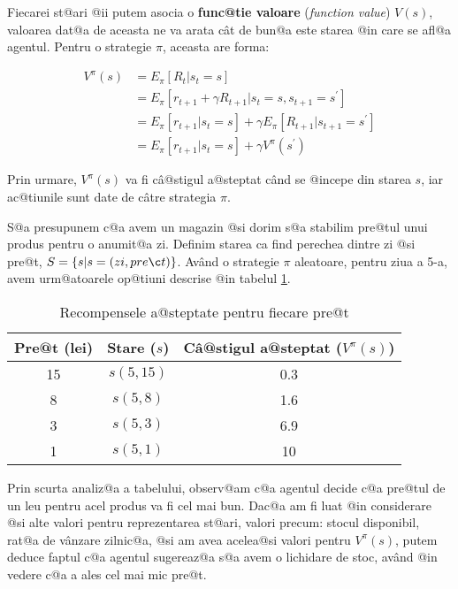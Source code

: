Fiecarei st@ari @ii putem asocia o \textbf{func@tie valoare} (\textsl{function value}) $V(s)$, valoarea dat@a de aceasta ne va arata c\^ at de bun@a este starea @in care se afl@a agentul. Pentru o strategie $\pi$, aceasta are forma:


\begin{align}
	V^{\pi}(s) & =   E_{\pi} \left[ R_t | s_t = s \right] \\
	& =  E_{\pi} \left[ r_{t+1} + \gamma R_{t+1} | s_t = s, s_{t+1} = s^{\prime} \right] \\
	& =   E_{\pi} \left[ r_{t+1}| s_t = s \right] + \gamma E_{\pi} \left[  R_{t+1} | s_{t+1} = s^{\prime} \right] \\
	& =  E_{\pi} \left[ r_{t+1}| s_t = s \right] + \gamma V^{\pi}(s^{\prime})
\end{align}

\noindent Prin urmare, $V^{\pi}(s)$ va fi c\^ a@stigul a@steptat c\^ and se @incepe din starea $s$, iar ac@tiunile sunt date de c\^ atre strategia $\pi$.

S@a presupunem c@a avem un magazin @si dorim s@a stabilim pre@tul unui produs pentru o anumit@a zi. Definim starea ca find perechea dintre zi @si pre@t, $S = \left\lbrace  s | s = (zi, pre\c t) \right\rbrace$. Av\^ and o strategie $\pi$ aleatoare, pentru ziua a 5-a, avem urm@atoarele op@tiuni descrise @in tabelul \ref{tab:pret-magazin}.

\begin{table}[h]
	\begin{center}
		\begin{tabular}{|c|c|c|}
			\hline
			Pre@t (lei) & Stare ($s$) & C\^ a@stigul a@steptat ($V^{\pi}(s)$) \\
			\hline
			15 & $s(5,15)$ & 0.3 \\
			\hline
			8 & $s(5,8)$ & 1.6 \\
			\hline
			3 & $s(5,3)$ & 6.9 \\
			\hline
			1 & $s(5,1)$ & 10 \\ 
			\hline
		\end{tabular}
	\end{center}
	\caption{Recompensele a@steptate pentru fiecare pre@t}
	\label{tab:pret-magazin}
\end{table}

Prin scurta analiz@a a tabelului, observ@am c@a agentul decide c@a pre@tul de un leu pentru acel produs va fi cel mai bun. Dac@a am fi luat @in considerare @si alte valori pentru reprezentarea st@ari, valori precum: stocul disponibil, rat@a de v\^ anzare zilnic@a, @si am avea acelea@si valori pentru $V^{\pi}(s)$, putem deduce faptul c@a agentul sugereaz@a s@a avem o lichidare de stoc, av\^and @in vedere c@a a ales cel mai mic pre@t.

